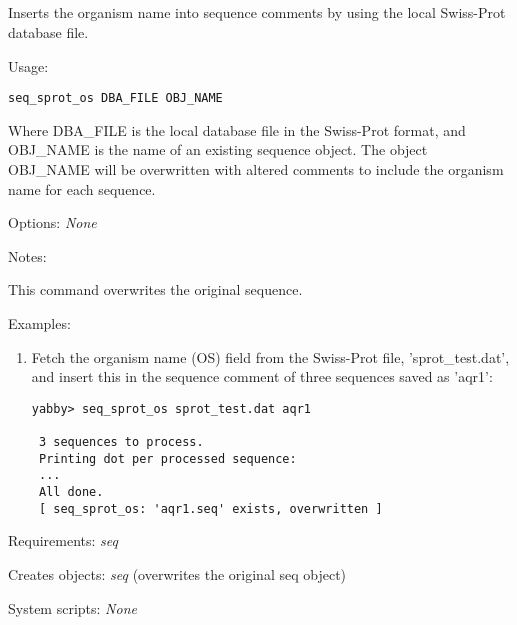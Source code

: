 

\subsection[seq\_sprot\_os]{  }



Inserts the organism name into sequence comments by using
the local Swiss-Prot database file.


\begin{description}


\item{Usage:}

{\tt seq\_sprot\_os DBA\_FILE OBJ\_NAME}

Where DBA\_FILE is the local database file in the Swiss-Prot
format, and OBJ\_NAME is the name of an existing sequence
object. The object OBJ\_NAME will be overwritten with altered
comments to include the organism name for each sequence.


\item{Options:}
{\em None}


\item{Notes:}
\begin{description}
\item This command overwrites the original sequence.
\end{description}


\item{Examples:}
\begin{enumerate}

\item Fetch the organism name (OS) field from the Swiss-Prot file,
'sprot\_test.dat', and insert this in the sequence comment of three
sequences saved as 'aqr1':
\begin{verbatim}
yabby> seq_sprot_os sprot_test.dat aqr1 

 3 sequences to process.
 Printing dot per processed sequence:
 ...
 All done.
 [ seq_sprot_os: 'aqr1.seq' exists, overwritten ]
\end{verbatim}

\end{enumerate}


\item{Requirements:} {\em seq}


\item{Creates objects:} {\em seq} (overwrites the original seq object)


\item{System scripts:} {\em None}

\end{description}

